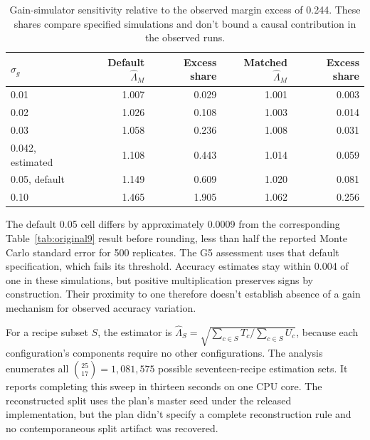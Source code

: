 \begin{table}[!htb]
\centering
\caption{Gain-simulator sensitivity relative to the observed margin excess of 0.244. These shares compare specified simulations and don't bound a causal contribution in the observed runs.}
\label{tab:original13}
\small\setlength{\tabcolsep}{4pt}\renewcommand{\arraystretch}{1.12}
\begin{tabular}{lrrrr}\toprule
$\sigma_g$ & Default $\widehat\Lambda_M$ & Excess share & Matched $\widehat\Lambda_M$ & Excess share\\\midrule
0.01 & 1.007 & 0.029 & 1.001 & 0.003\\
0.02 & 1.026 & 0.108 & 1.003 & 0.014\\
0.03 & 1.058 & 0.236 & 1.008 & 0.031\\
0.042, estimated & 1.108 & 0.443 & 1.014 & 0.059\\
0.05, default & 1.149 & 0.609 & 1.020 & 0.081\\
0.10 & 1.465 & 1.905 & 1.062 & 0.256\\\bottomrule
\end{tabular}
\end{table}

The default 0.05 cell differs by approximately 0.0009 from the corresponding Table~\ref{tab:original9} result before rounding, less than half the reported Monte Carlo standard error for 500 replicates. The G5 assessment uses that default specification, which fails its threshold. Accuracy estimates stay within 0.004 of one in these simulations, but positive multiplication preserves signs by construction. Their proximity to one therefore doesn't establish absence of a gain mechanism for observed accuracy variation.

For a recipe subset $S$, the estimator is $\widehat\Lambda_S=\sqrt{\sum_{c\in S}T_c/\sum_{c\in S}U_c}$, because each configuration's components require no other configurations. The analysis enumerates all $\binom{25}{17}=1{,}081{,}575$ possible seventeen-recipe estimation sets. It reports completing this sweep in thirteen seconds on one CPU core. The reconstructed split uses the plan's master seed under the released implementation, but the plan didn't specify a complete reconstruction rule and no contemporaneous split artifact was recovered.

